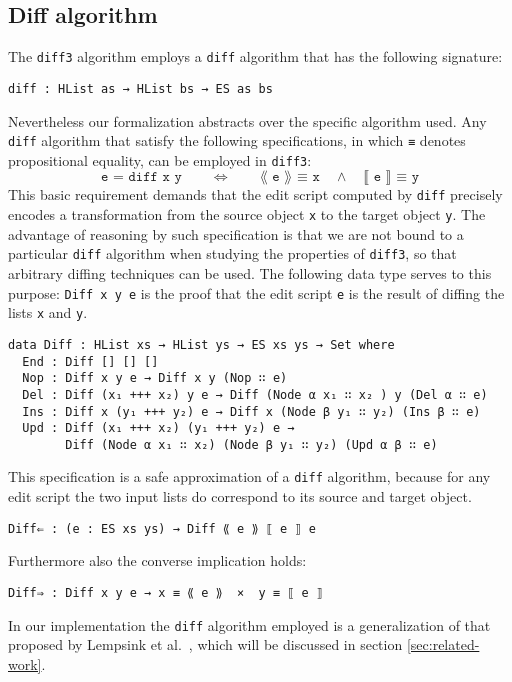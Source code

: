 \documentclass[preprint]{sigplanconf}
\begin{document}
	\subsection{Diff algorithm}
        \label{subsec:diff-algo}
	The \texttt{diff3} algorithm employs a \texttt{diff} algorithm
        that has the following signature:
\begin{verbatim}
diff : HList as → HList bs → ES as bs
\end{verbatim}
        Nevertheless our formalization abstracts over the specific
        algorithm used.
        Any \texttt{diff} algorithm that satisfy the following
        specifications, in which \texttt{≡} denotes propositional
        equality, can be employed in \texttt{diff3}:
\[ \texttt{e = diff x y} \qquad \Leftrightarrow \qquad \texttt{⟪ e ⟫ ≡ x} \quad \land \quad  \texttt{⟦ e ⟧ ≡ y} \]
	This basic requirement demands that the edit script computed by 
	\texttt{diff} precisely encodes a transformation from the source object 
	\texttt{x} to the target object \texttt{y}.
	The advantage of reasoning by such specification is that we are not bound
	to a particular \texttt{diff} algorithm when studying the properties of 
	\texttt{diff3}, so that arbitrary diffing techniques can be used.
        The following data type serves to this purpose: \texttt{Diff x y e} is the 
        proof that the edit script \texttt{e} is the result of diffing the lists 
        \texttt{x} and \texttt{y}.
\begin{verbatim}
data Diff : HList xs → HList ys → ES xs ys → Set where
  End : Diff [] [] []
  Nop : Diff x y e → Diff x y (Nop ∷ e)
  Del : Diff (x₁ +++ x₂) y e → Diff (Node α x₁ ∷ x₂ ) y (Del α ∷ e)
  Ins : Diff x (y₁ +++ y₂) e → Diff x (Node β y₁ ∷ y₂) (Ins β ∷ e)
  Upd : Diff (x₁ +++ x₂) (y₁ +++ y₂) e → 
        Diff (Node α x₁ ∷ x₂) (Node β y₁ ∷ y₂) (Upd α β ∷ e)
\end{verbatim}
        This specification  is a safe approximation of a \texttt{diff} algorithm,
        because for any edit script the two input lists do correspond to its
        source and target object.
\begin{verbatim}
Diff⇐ : (e : ES xs ys) → Diff ⟪ e ⟫ ⟦ e ⟧ e
\end{verbatim}
        Furthermore also the converse implication holds:
\begin{verbatim}
Diff⇒ : Diff x y e → x ≡ ⟪ e ⟫  ×  y ≡ ⟦ e ⟧
\end{verbatim}

	In our implementation the \texttt{diff} algorithm employed is a 
        generalization of that proposed by Lempsink et al.\ \cite{Lemp09},
        which will be discussed in section \ref{sec:related-work}.
        
\end{document}
